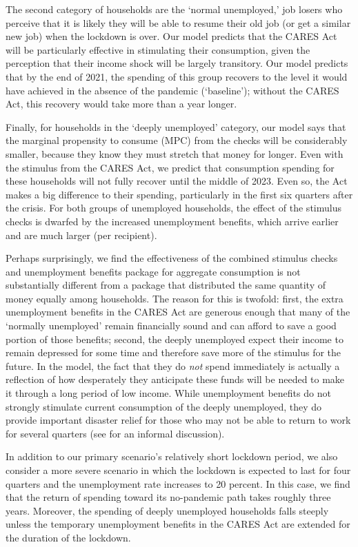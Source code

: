 \documentclass[titlepage,letterpaper]{\econtex}
\begin{document}
The second category of households are the `normal unemployed,' job losers who perceive that it is likely they will be able to resume their old job (or get a similar new job) when the lockdown is over.
Our model predicts that the CARES Act will be particularly effective in stimulating their consumption, given the perception that their income shock will be largely transitory.  Our model predicts that by the end of 2021, the spending of this group recovers to the level it would have achieved in the absence of the pandemic (`baseline'); without the CARES Act, this recovery would take more than a year longer.

Finally, for households in the `deeply unemployed' category, our model says that the marginal propensity to consume (MPC) from the checks will be considerably smaller, because they know they must stretch that money for longer.
Even with the stimulus from the CARES Act, we predict that consumption spending for these households will not fully recover until the middle of 2023.
Even so, the Act makes a big difference to their spending, particularly in the first six quarters after the crisis.
For both groups of unemployed households, the effect of the stimulus checks is dwarfed by the increased unemployment benefits, which arrive earlier and are much larger (per recipient).

Perhaps surprisingly, we find the effectiveness of the combined stimulus checks and unemployment benefits package for aggregate consumption is not substantially different from a package that distributed the same quantity of money equally among households.
The reason for this is twofold: first, the extra unemployment benefits in the CARES Act are generous enough that many of the `normally unemployed' remain financially sound and can afford to save a good portion of those benefits; second, the deeply unemployed expect their income to remain depressed for some time and therefore save more of the stimulus for the future.  In the model, the fact that they do \textit{not} spend immediately is actually a reflection of how desperately they anticipate these funds will be needed to make it through a long period of low income.
While unemployment benefits do not strongly stimulate current consumption of the deeply unemployed, they do provide important disaster relief for those who may not be able to return to work for several quarters (see \cite{krugman_corona} for an informal discussion).

In addition to our primary scenario's relatively short lockdown period, we also consider a more severe scenario in which the lockdown is expected to last for four quarters and the unemployment rate increases to 20 percent.
In this case, we find that the return of spending toward its no-pandemic path takes roughly three years. Moreover, the spending of deeply unemployed households falls steeply unless the temporary unemployment benefits in the CARES Act are extended for the duration of the lockdown.
\end{document}
